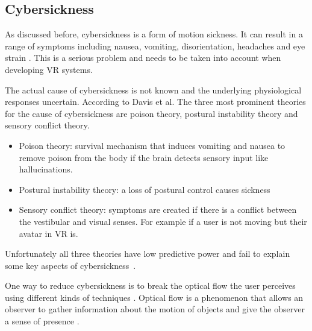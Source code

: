 \subsection{Cybersickness}\label{cybersickness}

As discussed before, cybersickness is a form of motion sickness. It can
result in a range of symptoms including nausea, vomiting,
disorientation, headaches and eye strain
\cite{LaViola}. This is a serious problem and needs to
be taken into account when developing VR systems.

The actual cause of cybersickness is not
known and the underlying physiological responses uncertain. According to Davis et al. \cite{Davis} The three
most prominent theories for the cause of cybersickness are poison
theory, postural instability theory and sensory conflict theory.

\begin{itemize}
\itemsep1pt\parskip0pt
\item
  Poison theory: survival mechanism that induces vomiting and nausea to
  remove poison from the body if the brain detects sensory input like
  hallucinations.\\
\item
  Postural instability theory: a loss of postural control causes
  sickness\\
\item
  Sensory conflict theory: symptoms are created if there is a conflict
  between the vestibular and visual senses. For example if a user is not
  moving but their avatar in VR is.
\end{itemize}

Unfortunately all three theories have low predictive power and fail to
explain some key aspects of cybersickness~\cite{Davis}.

One way to reduce cybersickness is to break the optical flow the user
perceives using different kinds of techniques
\cite{Bhandari}. Optical flow is a phenomenon that
allows an observer to gather information about the motion of objects and
give the observer a sense of presence \cite{Gibson}.

